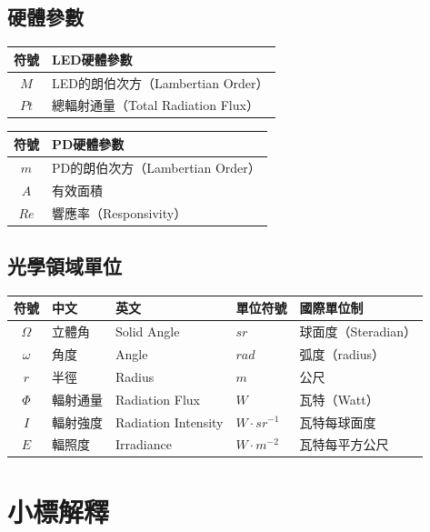 \onehalfspacing

\subsection*{硬體參數}

\begin{longtable}[l]{cl}
    符號 & LED硬體參數\\ \hline
    $M$ & LED的朗伯次方（Lambertian Order）\\
    $Pt$ & 總輻射通量（Total Radiation Flux） 
\end{longtable}

\begin{longtable}[l]{cl}
    符號 & PD硬體參數\\ \hline
    $m$ & PD的朗伯次方（Lambertian Order）\\
    $A$ & 有效面積\\
    $Re$ & 響應率（Responsivity）\\
\end{longtable}


\onehalfspacing

\subsection*{光學領域單位}

\begin{longtable}[l]{cllll}
    符號& 中文& 英文 & 單位符號&國際單位制\\\hline
    $\Omega$ & 立體角&Solid Angle& $sr$&球面度（Steradian） \\
    $\omega$ & 角度&Angle& $rad$&弧度（radius）\\
    $r$ & 半徑&Radius&  $m$ &公尺\\
    $\Phi$ & 輻射通量&Radiation Flux& $W$&瓦特（Watt）\\
    $I$ & 輻射強度&Radiation Intensity & $W\cdot sr^{-1}$&瓦特每球面度 \\
    $E$ & 輻照度&Irradiance&$W\cdot m^{-2}$ &瓦特每平方公尺\\
\end{longtable}




\onehalfspacing

\section*{小標解釋}

